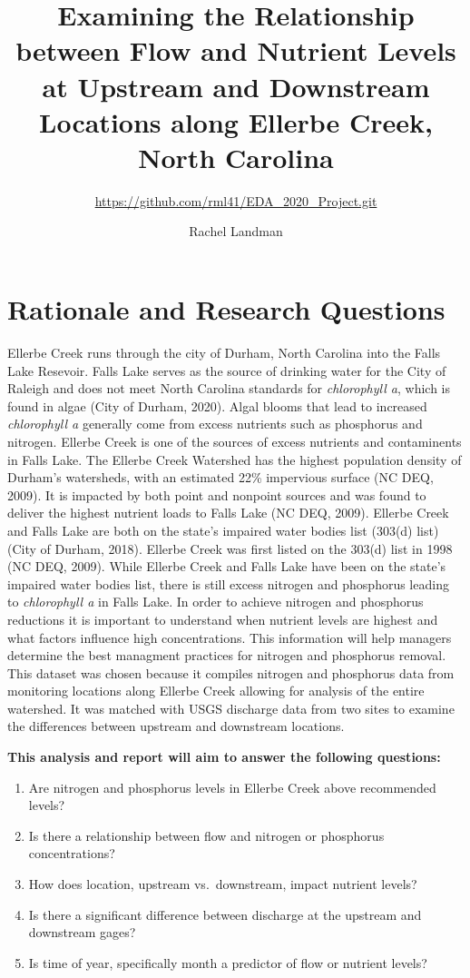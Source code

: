 \documentclass[12pt,]{article}
\title{Examining the Relationship between Flow and Nutrient Levels at Upstream
and Downstream Locations along Ellerbe Creek, North Carolina}
\subtitle{\url{https://github.com/rml41/EDA_2020_Project.git}}
\author{Rachel Landman}
\date{}
\begin{document}
\maketitle

\newpage
\tableofcontents 
\newpage
\listoftables 
\newpage
\listoffigures 
\newpage

\hypertarget{rationale-and-research-questions}{%
\section{Rationale and Research
Questions}\label{rationale-and-research-questions}}

Ellerbe Creek runs through the city of Durham, North Carolina into the
Falls Lake Resevoir. Falls Lake serves as the source of drinking water
for the City of Raleigh and does not meet North Carolina standards for
\emph{chlorophyll a}, which is found in algae (City of Durham, 2020).
Algal blooms that lead to increased \emph{chlorophyll a} generally come
from excess nutrients such as phosphorus and nitrogen. Ellerbe Creek is
one of the sources of excess nutrients and contaminents in Falls Lake.
The Ellerbe Creek Watershed has the highest population density of
Durham's watersheds, with an estimated 22\% impervious surface (NC DEQ,
2009). It is impacted by both point and nonpoint sources and was found
to deliver the highest nutrient loads to Falls Lake (NC DEQ, 2009).
Ellerbe Creek and Falls Lake are both on the state's impaired water
bodies list (303(d) list) (City of Durham, 2018). Ellerbe Creek was
first listed on the 303(d) list in 1998 (NC DEQ, 2009). While Ellerbe
Creek and Falls Lake have been on the state's impaired water bodies
list, there is still excess nitrogen and phosphorus leading to
\emph{chlorophyll a} in Falls Lake. In order to achieve nitrogen and
phosphorus reductions it is important to understand when nutrient levels
are highest and what factors influence high concentrations. This
information will help managers determine the best managment practices
for nitrogen and phosphorus removal. This dataset was chosen because it
compiles nitrogen and phosphorus data from monitoring locations along
Ellerbe Creek allowing for analysis of the entire watershed. It was
matched with USGS discharge data from two sites to examine the
differences between upstream and downstream locations.

\textbf{This analysis and report will aim to answer the following
questions:}

\begin{enumerate}
\def\labelenumi{\arabic{enumi}.}
\item
  Are nitrogen and phosphorus levels in Ellerbe Creek above recommended
  levels?
\item
  Is there a relationship between flow and nitrogen or phosphorus
  concentrations?
\item
  How does location, upstream vs.~downstream, impact nutrient levels?
\item
  Is there a significant difference between discharge at the upstream
  and downstream gages?
\item
  Is time of year, specifically month a predictor of flow or nutrient
  levels?
\end{enumerate}
\end{document}
